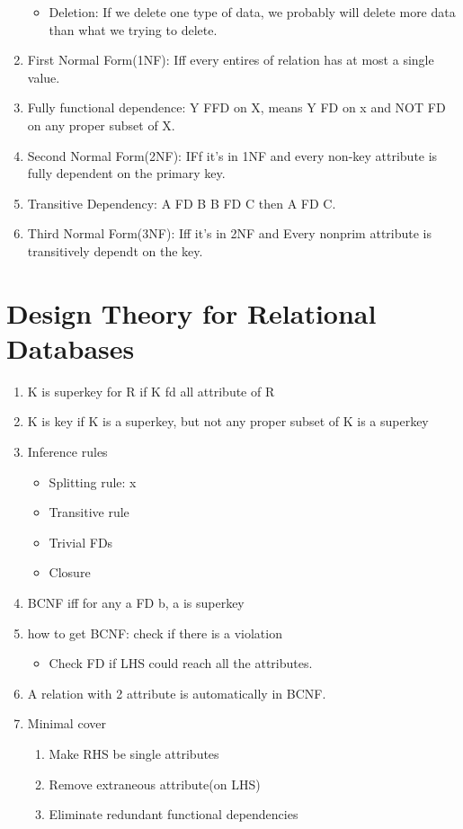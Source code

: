 \begin{enumerate}
\begin{itemize}
        \item Deletion: If we delete one type of data, we probably will delete more data than what we trying to delete. 
    \end{itemize}
    \item First Normal Form(1NF): Iff every entires of relation has at most a single value.
    \item Fully functional dependence: Y FFD on X, means Y FD on x and NOT FD on any proper subset of X.
    \item Second Normal Form(2NF): IFf it's in 1NF and every non-key attribute is fully dependent on the primary key.
    \item Transitive Dependency: A FD B B FD C then A FD C.
    \item Third Normal Form(3NF): Iff it's in 2NF and Every nonprim attribute is transitively dependt on the key.
    
\end{enumerate}
\section{Design Theory for Relational Databases}
\begin{enumerate}
    \item K is superkey for R if K fd all attribute of R
    \item K is key if K is a superkey, but not any proper subset of K is a superkey
    
    \item Inference rules\begin{itemize}
        \item Splitting rule: x 
        \item Transitive rule
        \item Trivial FDs
        \item Closure
    \end{itemize}
    
    \item BCNF iff for any a FD b, a is superkey
    \item how to get BCNF: check if there is a violation\begin{itemize}
        \item Check FD if LHS could reach all the attributes.
    \end{itemize}
    \item A relation with 2 attribute is automatically in BCNF.
    \item Minimal cover\begin{enumerate}
        \item Make RHS be single attributes
        \item Remove extraneous attribute(on LHS)
        \item Eliminate redundant functional dependencies
    \end{enumerate}
\end{enumerate}
